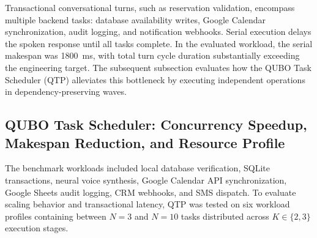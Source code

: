 \documentclass[review,12pt,times,authoryear]{elsarticle}
\theoremstyle{definition}
\begin{document}
Transactional conversational turns, such as reservation validation, encompass multiple backend tasks: database availability writes, Google Calendar synchronization, audit logging, and notification webhooks. Serial execution delays the spoken response until all tasks complete. In the evaluated workload, the serial makespan was \SI{1800}{\milli\second}, with total turn cycle duration substantially exceeding the engineering target. The subsequent subsection evaluates how the QUBO Task Scheduler (QTP) alleviates this bottleneck by executing independent operations in dependency-preserving waves.

\subsection{QUBO Task Scheduler: Concurrency Speedup, Makespan Reduction, and Resource Profile}
\label{sec:qtp_results}
The benchmark workloads included local database verification, SQLite transactions, neural voice synthesis, Google Calendar API synchronization, Google Sheets audit logging, CRM webhooks, and SMS dispatch. To evaluate scaling behavior and transactional latency, QTP was tested on six workload profiles containing between $N=3$ and $N=10$ tasks distributed across $K\in\{2,3\}$ execution stages.
\end{document}
